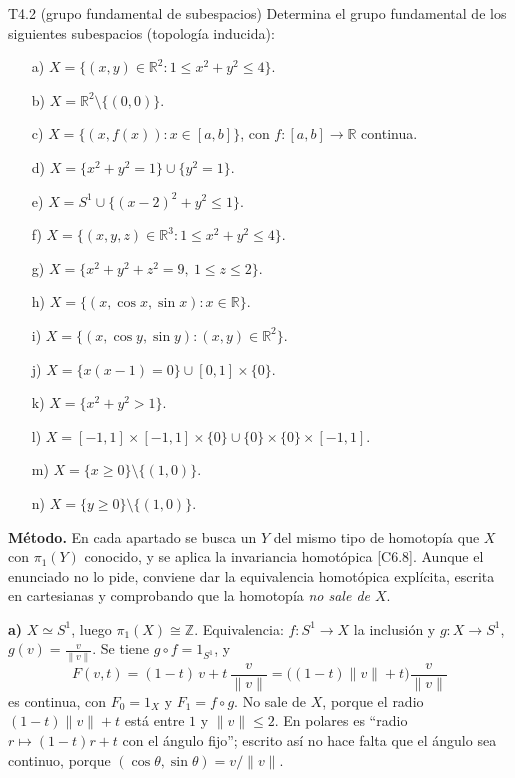 \begin{ejercicio}{T4.2 (grupo fundamental de subespacios)}
Determina el grupo fundamental de los siguientes subespacios (topología inducida):
\begin{enumerate}
    \item[a)] $X = \{(x,y) \in \mathbb{R}^2 : 1 \leq x^2+y^2 \leq 4\}$.
    \item[b)] $X = \mathbb{R}^2 \setminus \{(0,0)\}$.
    \item[c)] $X = \{(x,f(x)) : x \in [a,b]\}$, con $f \colon [a,b] \to \mathbb{R}$ continua.
    \item[d)] $X = \{x^2+y^2 = 1\} \cup \{y^2 = 1\}$.
    \item[e)] $X = S^1 \cup \{(x-2)^2+y^2 \leq 1\}$.
    \item[f)] $X = \{(x,y,z) \in \mathbb{R}^3 : 1 \leq x^2+y^2 \leq 4\}$.
    \item[g)] $X = \{x^2+y^2+z^2 = 9,\ 1 \leq z \leq 2\}$.
    \item[h)] $X = \{(x,\cos x,\sin x) : x \in \mathbb{R}\}$.
    \item[i)] $X = \{(x,\cos y,\sin y) : (x,y) \in \mathbb{R}^2\}$.
    \item[j)] $X = \{x(x-1) = 0\} \cup [0,1] \times \{0\}$.
    \item[k)] $X = \{x^2+y^2 > 1\}$.
    \item[l)] $X = [-1,1] \times [-1,1] \times \{0\} \cup \{0\} \times \{0\} \times [-1,1]$.
    \item[m)] $X = \{x \geq 0\} \setminus \{(1,0)\}$.
    \item[n)] $X = \{y \geq 0\} \setminus \{(1,0)\}$.
\end{enumerate}

\textbf{Método.} En cada apartado se busca un $Y$ del mismo tipo de homotopía que $X$ con $\pi_1(Y)$ conocido, y se aplica la invariancia homotópica [C6.8]. Aunque el enunciado no lo pide, conviene dar la equivalencia homotópica explícita, escrita en cartesianas y comprobando que la homotopía \emph{no sale de $X$}.

\medskip
{}

\textbf{a)} $X \simeq S^1$, luego $\pi_1(X) \cong \mathbb{Z}$. Equivalencia: $f \colon S^1 \to X$ la inclusión y $g \colon X \to S^1$, $g(v) = \frac{v}{\|v\|}$. Se tiene $g \circ f = 1_{S^1}$, y
\[ F(v,t) = (1-t)\,v + t\,\frac{v}{\|v\|} = \big((1-t)\|v\| + t\big)\frac{v}{\|v\|} \]
es continua, con $F_0 = 1_X$ y $F_1 = f \circ g$. No sale de $X$, porque el radio $(1-t)\|v\| + t$ está entre $1$ y $\|v\| \leq 2$. En polares es ``radio $r \mapsto (1-t)r + t$ con el ángulo fijo''; escrito así no hace falta que el ángulo sea continuo, porque $(\cos\theta,\sin\theta) = v/\|v\|$.


\end{ejercicio}
